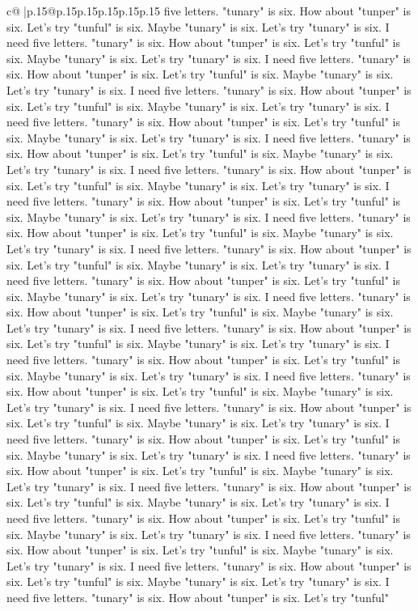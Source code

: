 \documentclass{article}
\begin{document}
{\begin{supertabular}{c@{$\;$}|p{.15\linewidth}@{}p{.15\linewidth}p{.15\linewidth}p{.15\linewidth}p{.15\linewidth}p{.15\linewidth}}
{{{five letters. "tunary" is six. How about "tunper" is six. Let's try "tunful" is six. Maybe "tunary" is six. Let's try "tunary" is six. I need five letters. "tunary" is six. How about "tunper" is six. Let's try "tunful" is six. Maybe "tunary" is six. Let's try "tunary" is six. I need five letters. "tunary" is six. How about "tunper" is six. Let's try "tunful" is six. Maybe "tunary" is six. Let's try "tunary" is six. I need five letters. "tunary" is six. How about "tunper" is six. Let's try "tunful" is six. Maybe "tunary" is six. Let's try "tunary" is six. I need five letters. "tunary" is six. How about "tunper" is six. Let's try "tunful" is six. Maybe "tunary" is six. Let's try "tunary" is six. I need five letters. "tunary" is six. How about "tunper" is six. Let's try "tunful" is six. Maybe "tunary" is six. Let's try "tunary" is six. I need five letters. "tunary" is six. How about "tunper" is six. Let's try "tunful" is six. Maybe "tunary" is six. Let's try "tunary" is six. I need five letters. "tunary" is six. How about "tunper" is six. Let's try "tunful" is six. Maybe "tunary" is six. Let's try "tunary" is six. I need five letters. "tunary" is six. How about "tunper" is six. Let's try "tunful" is six. Maybe "tunary" is six. Let's try "tunary" is six. I need five letters. "tunary" is six. How about "tunper" is six. Let's try "tunful" is six. Maybe "tunary" is six. Let's try "tunary" is six. I need five letters. "tunary" is six. How about "tunper" is six. Let's try "tunful" is six. Maybe "tunary" is six. Let's try "tunary" is six. I need five letters. "tunary" is six. How about "tunper" is six. Let's try "tunful" is six. Maybe "tunary" is six. Let's try "tunary" is six. I need five letters. "tunary" is six. How about "tunper" is six. Let's try "tunful" is six. Maybe "tunary" is six. Let's try "tunary" is six. I need five letters. "tunary" is six. How about "tunper" is six. Let's try "tunful" is six. Maybe "tunary" is six. Let's try "tunary" is six. I need five letters. "tunary" is six. How about "tunper" is six. Let's try "tunful" is six. Maybe "tunary" is six. Let's try "tunary" is six. I need five letters. "tunary" is six. How about "tunper" is six. Let's try "tunful" is six. Maybe "tunary" is six. Let's try "tunary" is six. I need five letters. "tunary" is six. How about "tunper" is six. Let's try "tunful" is six. Maybe "tunary" is six. Let's try "tunary" is six. I need five letters. "tunary" is six. How about "tunper" is six. Let's try "tunful" is six. Maybe "tunary" is six. Let's try "tunary" is six. I need five letters. "tunary" is six. How about "tunper" is six. Let's try "tunful" is six. Maybe "tunary" is six. Let's try "tunary" is six. I need five letters. "tunary" is six. How about "tunper" is six. Let's try "tunful" is six. Maybe "tunary" is six. Let's try "tunary" is six. I need five letters. "tunary" is six. How about "tunper" is six. Let's try "tunful" is six. Maybe "tunary" is six. Let's try "tunary" is six. I need five letters. "tunary" is six. How about "tunper" is six. Let's try "tunful" is six. Maybe "tunary" is six. Let's try "tunary" is six. I need five letters. "tunary" is six. How about "tunper" is six. Let's try "tunful" }}}
\end{supertabular}}
\end{document}
